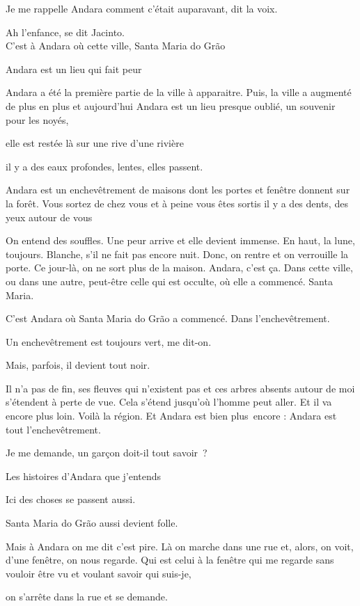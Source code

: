Je me rappelle Andara comment c'était auparavant, dit la voix.

Ah l'enfance, se dit Jacinto.\\

C'est à Andara où cette ville, Santa Maria do Grão

Andara est un lieu qui fait peur

Andara a été la première partie de la ville à apparaitre. Puis, la ville
a augmenté de plus en plus et aujourd'hui Andara est un lieu presque
oublié, un souvenir pour les noyés,

elle est restée là sur une rive d'une rivière

il y a des eaux profondes, lentes, elles passent.

Andara est un enchevêtrement de maisons dont les portes et fenêtre
donnent sur la forêt. Vous sortez de chez vous et à peine vous êtes
sortis il y a des dents, des yeux autour de vous

On entend des souffles. Une peur arrive et elle devient immense. En
haut, la lune, toujours. Blanche, s'il ne fait pas encore nuit. Donc, on
rentre et on verrouille la porte. Ce jour-là, on ne sort plus de la
maison. Andara, c'est ça. Dans cette ville, ou dans une autre, peut-être
celle qui est occulte, où elle a commencé. Santa Maria.

C'est Andara où Santa Maria do Grão a commencé. Dans l'enchevêtrement.

Un enchevêtrement est toujours vert, me dit-on.

Mais, parfois, il devient tout noir.

Il n'a pas de fin, ses fleuves qui n'existent pas et ces arbres absents
autour de moi s'étendent à perte de vue. Cela s'étend jusqu'où l'homme
peut aller. Et il va encore plus loin. Voilà la région. Et Andara est
bien plus~encore : Andara est tout l'enchevêtrement.

Je me demande, un garçon doit-il tout savoir~?

Les histoires d'Andara que j'entends

Ici des choses se passent aussi.

Santa Maria do Grão aussi devient folle.

Mais à Andara on me dit c'est pire. Là on marche dans une rue et, alors,
on voit, d'une fenêtre, on nous regarde. Qui est celui à la fenêtre qui
me regarde sans vouloir être vu et voulant savoir qui suis-je,

on s'arrête dans la rue et se demande.

